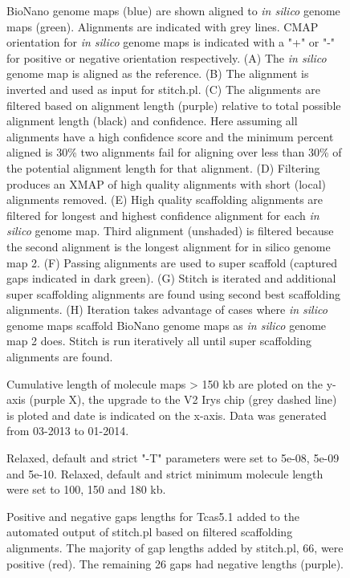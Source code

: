 \documentclass{bmcart}
\begin{document}
\begin{backmatter}
\begin{figure}[h!]
{      BioNano genome maps (blue) are shown aligned to \textit{in silico} genome maps (green). Alignments are indicated with grey lines. CMAP orientation for \textit{in silico} genome maps is indicated with a "+" or "-" for positive or negative orientation respectively. (A) The \textit{in silico} genome map is aligned as the reference. (B) The alignment is inverted and used as input for stitch.pl. (C) The alignments are filtered based on alignment length (purple) relative to total possible alignment length (black) and confidence. Here assuming all alignments have a high confidence score and the minimum percent aligned is 30\% two alignments fail for aligning over less than 30\% of the potential alignment length for that alignment. (D) Filtering produces an XMAP of high quality alignments with short (local) alignments removed. (E) High quality scaffolding alignments are filtered for longest and highest confidence alignment for each \textit{in silico} genome map. Third alignment (unshaded) is filtered because the second alignment is the longest alignment for {in silico} genome map 2. (F) Passing alignments are used to super scaffold (captured gaps indicated in dark green). (G) Stitch is iterated and additional super scaffolding alignments are found using second best scaffolding alignments. (H) Iteration takes advantage of cases where \textit{in silico} genome maps scaffold BioNano genome maps as \textit{in silico} genome map 2 does. Stitch is run iteratively all until super scaffolding alignments are found.}
      \end{figure} 
\begin{figure}[h!]
	\caption{
		Cumulative length of molecule maps > 150 kb are ploted on the y-axis (purple X), the upgrade to the V2 Irys chip (grey dashed line) is ploted and date is indicated on the x-axis. Data was generated from 03-2013 to 01-2014.}
\end{figure}
\begin{figure}[h!]
	\caption{
		Relaxed, default and strict "-T" parameters were set to 5e-08, 5e-09 and 5e-10. Relaxed, default and strict minimum molecule length were set to 100, 150 and 180 kb.}
\end{figure}     
\begin{figure}[h!]
	\caption{
		Positive and negative gaps lengths for Tcas5.1 added to the automated output of stitch.pl based on filtered scaffolding alignments. The majority of gap lengths added by stitch.pl, 66, were positive (red). The remaining 26 gaps had negative lengths (purple).}

\end{figure}
\end{backmatter}
\end{document}
